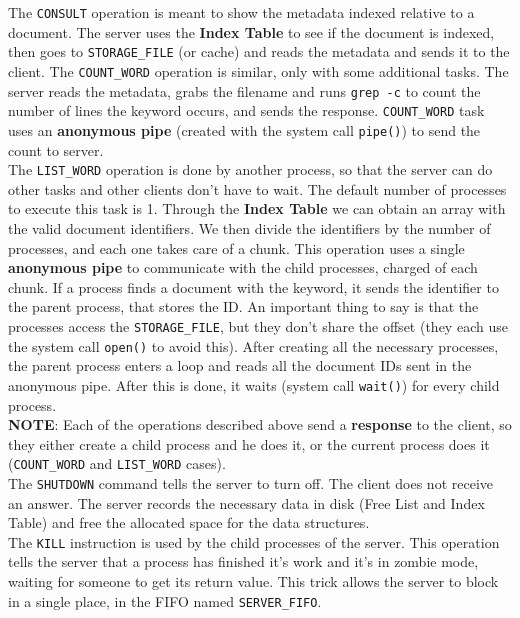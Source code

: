 \documentclass[a4paper, 11pt]{article}
\begin{document}
\noindent The \texttt{CONSULT} operation is meant to show the metadata indexed relative to a document. The server uses the \textbf{Index Table} to see if the document is indexed, then goes to \texttt{STORAGE\_FILE} (or cache) and reads the metadata and sends it to the client. The \texttt{COUNT\_WORD} operation is similar, only with some additional tasks. The server reads the metadata, grabs the filename and runs \texttt{grep -c} to count the number of lines the keyword occurs, and sends the response. \texttt{COUNT\_WORD} task uses an \textbf{anonymous pipe} (created with the system call \texttt{pipe()}) to send the count to server.\\

\noindent The \texttt{LIST\_WORD} operation is done by another process, so that the server can do other tasks and other clients don't have to wait. The default number of processes to execute this task is 1. Through the \textbf{Index Table} we can obtain an array with the valid document identifiers. We then divide the identifiers by the number of processes, and each one takes care of a chunk. This operation uses a single \textbf{anonymous pipe} to communicate with the child processes, charged of each chunk. If a process finds a document with the keyword, it sends the identifier to the parent process, that stores the ID. An important thing to say is that the processes access the \texttt{STORAGE\_FILE}, but they don't share the offset (they each use the system call \texttt{open()} to avoid this). After creating all the necessary processes, the parent process enters a loop and reads all the document IDs sent in the anonymous pipe. After this is done, it waits (system call \texttt{wait()}) for every child process.\\

\noindent \textbf{NOTE}: Each of the operations described above send a \textbf{response} to the client, so they either create a child process and he does it, or the current process does it (\texttt{COUNT\_WORD} and \texttt{LIST\_WORD} cases).\\

\noindent The \texttt{SHUTDOWN} command tells the server to turn off. The client does not receive an answer. The server records the necessary data in disk (Free List and Index Table) and free the allocated space for the data structures.\\

\noindent The \texttt{KILL} instruction is used by the child processes of the server. This operation tells the server that a process has finished it's work and it's in zombie mode, waiting for someone to get its return value. This trick allows the server to block in a single place, in the FIFO named \texttt{SERVER\_FIFO}.
\end{document}
